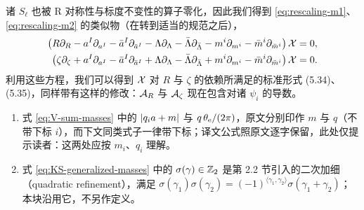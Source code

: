 诸 $S_\ell$ 也被 R 对称性与标度不变性的算子零化，因此我们得到 \eqref{eq:rescaling-m1}、\eqref{eq:rescaling-m2} 的类似物（在转到适当的规范之后），
\begin{align}
\left(R \partial_R - a^I \partial_{a^I} - \bar{a}^I \partial_{\bar{a}^I} - \Lambda \partial_\Lambda - \bar{\Lambda} \partial_{\bar{\Lambda}} - m^i \partial_{m^i} - \bar{m}^i \partial_{\bar{m}^i} \right) \mathcal{X} &= 0, \label{eq:rescaling-m1} \\
\left(\zeta \partial_\zeta + a^I \partial_{a^I} - \bar{a}^I \partial_{\bar{a}^I} + \Lambda \partial_\Lambda - \bar{\Lambda} \partial_{\bar{\Lambda}} + m^i \partial_{m^i} - \bar{m}^i \partial_{\bar{m}^i} \right) \mathcal{X} &= 0. \label{eq:rescaling-m2}
\end{align}
利用这些方程，我们可以得到 $\mathcal{X}$ 对 $R$ 与 $\zeta$ 的依赖所满足的标准形式 (5.34)、(5.35)，同样带有这样的修改：$\mathcal{A}_R$ 与 $\mathcal{A}_\zeta$ 现在包含对诸 $\psi_i$ 的导数。%

\begin{yizhu}
\begin{enumerate}[leftmargin=2em,itemsep=2pt,topsep=2pt]
\item 式 \eqref{eq:V-sum-masses} 中的 $\lvert q_i a + m \rvert$ 与 $q\,\theta_{\mathrm{e}}/(2\pi)$，原文分别印作 $m$ 与 $q$（不带下标 $i$），而下文同类式子一律带下标；译文公式照原文逐字保留，此处仅提示读者：这两处应按 $m_i$、$q_i$ 理解。
\item 式 \eqref{eq:KS-generalized-masses} 中的 $\sigma(\gamma)\in\mathbb{Z}_2$ 是第 2.2 节引入的二次加细（quadratic refinement），满足 $\sigma(\gamma_1)\sigma(\gamma_2)=(-1)^{\langle\gamma_1,\gamma_2\rangle}\sigma(\gamma_1+\gamma_2)$；本块沿用它，不另作定义。%
\end{enumerate}
\end{yizhu}
